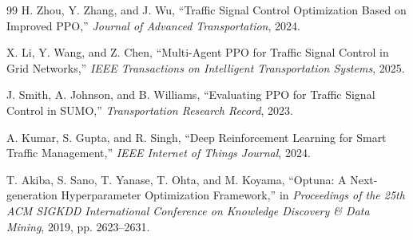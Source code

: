 \documentclass[12pt, a4paper]{report}
\begin{document}
\begin{thebibliography}{99}
 H. Zhou, Y. Zhang, and J. Wu, ``Traffic Signal Control Optimization Based on Improved PPO,'' \textit{Journal of Advanced Transportation}, 2024.

 X. Li, Y. Wang, and Z. Chen, ``Multi-Agent PPO for Traffic Signal Control in Grid Networks,'' \textit{IEEE Transactions on Intelligent Transportation Systems}, 2025.

 J. Smith, A. Johnson, and B. Williams, ``Evaluating PPO for Traffic Signal Control in SUMO,'' \textit{Transportation Research Record}, 2023.

 A. Kumar, S. Gupta, and R. Singh, ``Deep Reinforcement Learning for Smart Traffic Management,'' \textit{IEEE Internet of Things Journal}, 2024.

 T. Akiba, S. Sano, T. Yanase, T. Ohta, and M. Koyama, ``Optuna: A Next-generation Hyperparameter Optimization Framework,'' in \textit{Proceedings of the 25th ACM SIGKDD International Conference on Knowledge Discovery \& Data Mining}, 2019, pp. 2623–2631.

\end{thebibliography}
\end{document}

